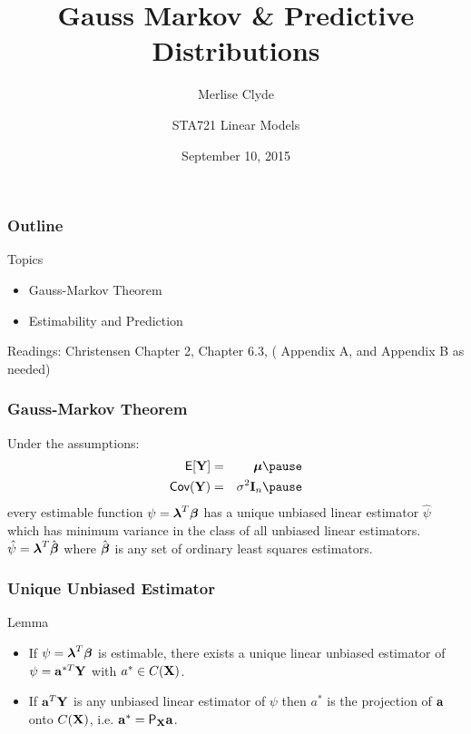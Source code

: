 \documentclass{beamer}
\title{Gauss Markov \& Predictive Distributions}
\subtitle{Merlise Clyde}
\author{STA721 Linear Models}
\institute{Duke University}
\date{September 10, 2015}
\begin{document}
\maketitle

\begin{frame}\frametitle{Outline}
Topics
  \begin{itemize}
  \item Gauss-Markov Theorem
  \item Estimability and Prediction
  \end{itemize}


Readings: Christensen Chapter 2,  Chapter 6.3, ( Appendix A, and
Appendix B as needed)
\end{frame}

\begin{frame}
  \frametitle{Gauss-Markov Theorem}
  \begin{theorem}

  Under the assumptions:
  \begin{eqnarray*}
    \E[\Y] & = & \mub \pause \\
    \Cov(\Y) & = &\sigma^2 \I_n \pause
  \end{eqnarray*}
every estimable function $\psi = \boldsymbol{\lambda}^T\boldsymbol{\beta}$ has a unique unbiased
linear estimator $\hat{\psi}$ which has minimum variance in the class
of all unbiased linear estimators. \pause  $\hat{\psi} = \boldsymbol{\lambda}^T\hat{\boldsymbol{\beta}}$
where $\hat{\boldsymbol{\beta}}$ is any set of ordinary least squares
estimators.
    
  \end{theorem}
\end{frame}
\begin{frame}
  \frametitle{Unique Unbiased Estimator}
  \begin{block}{Lemma}
    \begin{itemize}
    \item 
    If   $\psi = \boldsymbol{\lambda}^T \boldsymbol{\beta}$ is estimable, there exists a unique
    linear unbiased estimator of $\psi = \mathbf{a}^{*T}\mathbf{Y}$ with $a^* \in
    C(\mathbf{X})$. \pause 
\item If $\mathbf{a}^T\mathbf{Y}$ is any unbiased linear estimator of $\psi$
    then $a^*$ is the projection of $\mathbf{a}$ onto $C(\mathbf{X})$, i.e. $\mathbf{a}^* =
    \textsf{P}_{\mathbf{X}} \mathbf{a}$.
    \end{itemize}

  \end{block} 
      \end{frame}
\end{document}
